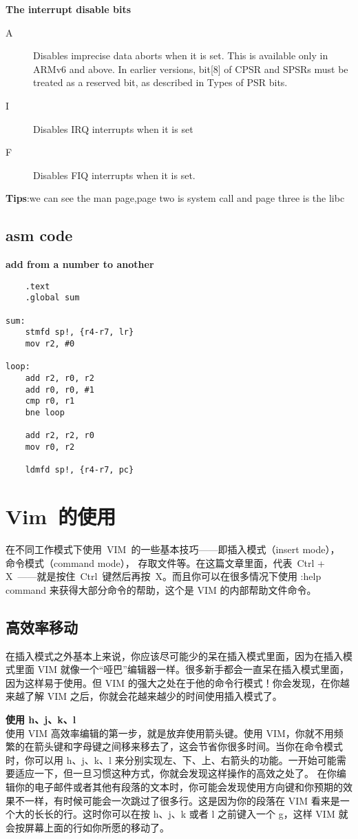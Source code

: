 \textbf{The interrupt disable bits}\\
\begin{description}
\item[A] Disables imprecise data aborts when it is set. This is available only in ARMv6 and above.
In earlier versions, bit[8] of CPSR and SPSRs must be treated as a reserved bit, as described
in Types of PSR bits.
\item[I] Disables IRQ interrupts when it is set
\item[F] Disables FIQ interrupts when it is set.
\end{description}
\textbf{Tips}:we can see the man page,page two is system call and page three is the libc

\subsection{asm code}
\textbf{add from a number to another}
\begin{verbatim}
	.text
	.global sum

sum:
	stmfd sp!, {r4-r7, lr}
	mov r2, #0

loop:
	add r2, r0, r2
	add r0, r0, #1
	cmp r0, r1
	bne loop

	add r2, r2, r0
	mov r0, r2

	ldmfd sp!, {r4-r7, pc}
\end{verbatim}

\section{Vim~的使用}
\indent 在不同工作模式下使用~VIM~的一些基本技巧——即插入模式（insert mode）， 命令模式（command mode）， 存取文件等。在这篇文章里面，代表~Ctrl + X~——就是按住~Ctrl~键然后再按~X。而且你可以在很多情况下使用 :help command 来获得大部分命令的帮助，这个是 VIM 的内部帮助文件命令。

\subsection{高效率移动}
在插入模式之外基本上来说，你应该尽可能少的呆在插入模式里面，因为在插入模式里面 VIM 就像一个“哑巴”编辑器一样。很多新手都会一直呆在插入模式里面，因为这样易于使用。但 VIM 的强大之处在于他的命令行模式！你会发现，在你越来越了解 VIM 之后，你就会花越来越少的时间使用插入模式了。

\textbf{使用 h、j、k、l}\\
使用 VIM 高效率编辑的第一步，就是放弃使用箭头键。使用 VIM，你就不用频繁的在箭头键和字母键之间移来移去了，这会节省你很多时间。当你在命令模式时，你可以用 h、j、k、l 来分别实现左、下、上、右箭头的功能。一开始可能需要适应一下，但一旦习惯这种方式，你就会发现这样操作的高效之处了。
在你编辑你的电子邮件或者其他有段落的文本时，你可能会发现使用方向键和你预期的效果不一样，有时候可能会一次跳过了很多行。这是因为你的段落在 VIM 看来是一个大的长长的行。这时你可以在按 h、j、k 或者 l 之前键入一个 g，这样 VIM 就会按屏幕上面的行如你所愿的移动了。

